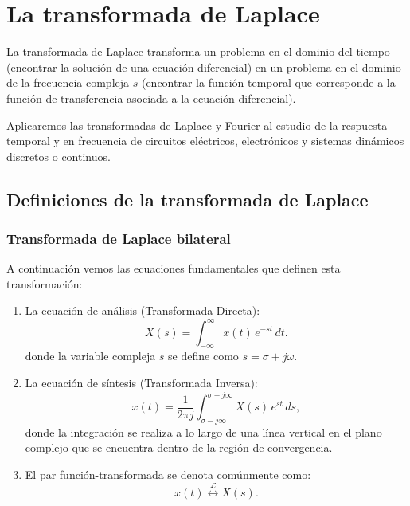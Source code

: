 \documentclass[11pt,a4paper,openany]{book}
\begin{document}

\chapter{La transformada de Laplace}

La transformada de Laplace transforma un problema en el dominio del tiempo (encontrar la solución de una ecuación diferencial) en un problema en el dominio de la frecuencia compleja $s$ (encontrar la función temporal que corresponde a la función de transferencia asociada a la ecuación diferencial).

Aplicaremos las transformadas de Laplace y Fourier al estudio de la respuesta temporal y en frecuencia de circuitos eléctricos, electrónicos y sistemas dinámicos discretos o continuos.

\section{Definiciones de la transformada de Laplace}

\subsection{Transformada de Laplace bilateral}

A continuación vemos las ecuaciones fundamentales que definen esta transformación:
\begin{enumerate}
	\item La ecuación de análisis (Transformada Directa):
	\begin{equation}
		X(s) = \int_{-\infty}^{\infty} x(t) \, e^{-st} \, dt.
	\end{equation}
	donde la variable compleja $s$ se define como $s = \sigma + j\omega$.
	
	\item La ecuación de síntesis (Transformada Inversa):
	\begin{equation}
		x(t) = \frac{1}{2\pi j} \int_{\sigma - j\infty}^{\sigma + j\infty} X(s) \, e^{st} \, ds,
	\end{equation}
	donde la integración se realiza a lo largo de una línea vertical en el plano complejo que se encuentra dentro de la región de convergencia.
	
	\item El par función-transformada se denota comúnmente como:
	\begin{equation}
		x(t) \stackrel{\mathcal{L}}{\longleftrightarrow} X(s).
	\end{equation}
\end{enumerate}
\end{document}
